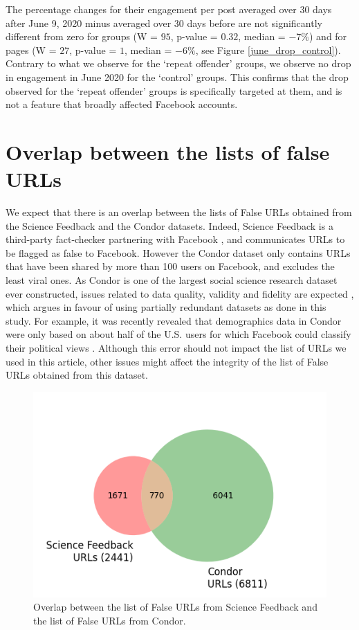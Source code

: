 \documentclass[review]{elsarticle}
\begin{document}
{{The percentage changes for their engagement per post averaged over 30 days after June 9, 2020 minus averaged over 30 days before are not significantly different from zero for groups (W = $95$, p-value = $0.32$, median = $-7\%$) and for pages (W = $27$, p-value = $1$, median = $-6\%$, see Figure \ref{june_drop_control}).
Contrary to what we observe for the `repeat offender' groups, we observe no drop in engagement in June 2020 for the `control' groups.
This confirms that the drop observed for the `repeat offender' groups is specifically targeted at them, and is not a feature that broadly affected Facebook accounts.

\section*{Overlap between the lists of false URLs}

We expect that there is an overlap between the lists of False URLs obtained from the Science Feedback and the Condor datasets. 
Indeed, Science Feedback is a third-party fact-checker partnering with Facebook \citep{sciencefeedbackFbPartner}, and communicates URLs to be flagged as false to Facebook.
However the Condor dataset only contains URLs that have been shared by more than 100 users on Facebook, and excludes the least viral ones.
As Condor is one of the largest social science research dataset ever constructed, issues related to data quality, validity and fidelity are expected \cite{messing2020facebook}, which argues in favour of using partially redundant datasets as done in this study.
For example, it was recently revealed that demographics data in Condor were only based on about half of the U.S. users for which Facebook could classify their political views \citep{NYTrevelations}. 
Although this error should not impact the list of URLs we used in this article, other issues might affect the integrity of the list of False URLs obtained from this dataset.

\begin{figure}[!h]
\centering
\includegraphics[scale=0.5]{./../figure/supplementary_venn_urls.png}
\caption{
Overlap between the list of False URLs from Science Feedback and the list of False URLs from Condor.
}
\label{venn_urls}
\end{figure}

}}
\end{document}
